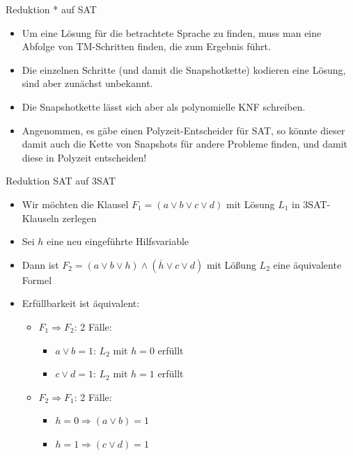 \documentclass[ignorenonframetext,]{beamer}
\begin{document}
\begin{frame}{Reduktion * auf SAT}

\begin{itemize}
\itemsep1pt\parskip0pt
\item
  Um eine Lösung für die betrachtete Sprache zu finden, muss man eine
  Abfolge von TM-Schritten finden, die zum Ergebnis führt.
\item
  Die einzelnen Schritte (und damit die Snapshotkette) kodieren eine
  Lösung, sind aber zunächst unbekannt.
\item
  Die Snapshotkette lässt sich aber als polynomielle KNF schreiben.
\item
  Angenommen, es gäbe einen Polyzeit-Entscheider für SAT, so könnte
  dieser damit auch die Kette von Snapshots für andere Probleme finden,
  und damit diese in Polyzeit entscheiden!
\end{itemize}

\end{frame}

\begin{frame}{Reduktion SAT auf 3SAT}

\begin{itemize}
\itemsep1pt\parskip0pt
\item
  Wir möchten die Klausel $F_1 = (a \vee b \vee c \vee d)$ mit Lösung
  $L_1$ in 3SAT-Klauseln zerlegen
\item
  Sei $h$ eine neu eingeführte Hilfsvariable
\item
  Dann ist $F_2 = (a \vee b \vee h) \wedge (\overline{h} \vee c \vee d)$
  mit Lößung $L_2$ eine äquivalente Formel
\item
  Erfüllbarkeit ist äquivalent:

  \begin{itemize}
  \itemsep1pt\parskip0pt
  \item
    $F_1 \Rightarrow F_2$: 2 Fälle:

    \begin{itemize}
    \itemsep1pt\parskip0pt
    \item
      $a \vee b = 1$: $L_2$ mit $h = 0$ erfüllt
    \item
      $c \vee d = 1$: $L_2$ mit $h = 1$ erfüllt
    \end{itemize}
  \item
    $F_2 \Rightarrow F_1$: 2 Fälle:

    \begin{itemize}
    \itemsep1pt\parskip0pt
    \item
      $h = 0 \Rightarrow (a \vee b) = 1$
    \item
      $h = 1 \Rightarrow (c \vee d) = 1$
    \end{itemize}
  \end{itemize}
\end{itemize}

\end{frame}
\end{document}
